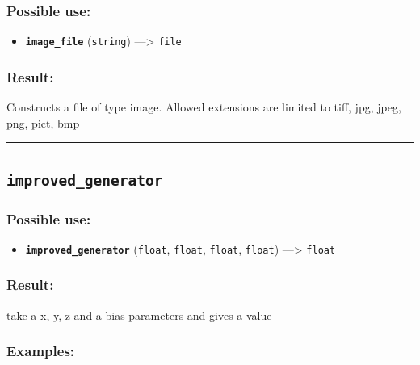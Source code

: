 \documentclass[]{book}
\providecommand{\tightlist}{%
  \setlength{\itemsep}{0pt}\setlength{\parskip}{0pt}}
\theoremstyle{definition}
\theoremstyle{definition}
\theoremstyle{definition}
\theoremstyle{remark}
\begin{document}
\subsubsection{Possible use:}\label{possible-use-264}

\begin{itemize}
\tightlist
\item
  \textbf{\texttt{image\_file}} (\texttt{string}) ---\textgreater{}
  \texttt{file}
\end{itemize}

\subsubsection{Result:}\label{result-254}

Constructs a file of type image. Allowed extensions are limited to tiff,
jpg, jpeg, png, pict, bmp

\begin{center}\rule{0.5\linewidth}{\linethickness}\end{center}

\subsection{\texorpdfstring{\texttt{improved\_generator}}{improved\_generator}}\label{improved_generator}

\subsubsection{Possible use:}\label{possible-use-265}

\begin{itemize}
\tightlist
\item
  \textbf{\texttt{improved\_generator}} (\texttt{float}, \texttt{float},
  \texttt{float}, \texttt{float}) ---\textgreater{} \texttt{float}
\end{itemize}

\subsubsection{Result:}\label{result-255}

take a x, y, z and a bias parameters and gives a value

\subsubsection{Examples:}\label{examples-203}
\end{document}
